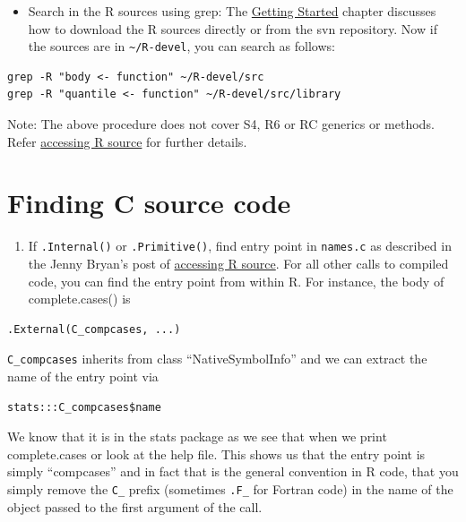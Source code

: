 \documentclass[
]{book}
\providecommand{\tightlist}{%
  \setlength{\itemsep}{0pt}\setlength{\parskip}{0pt}}
\begin{document}
\begin{itemize}
\tightlist
\item
  Search in the R sources using grep: The \protect\hyperlink{GetStart}{Getting Started} chapter discusses how to download the R sources directly or from the svn repository. Now if the sources are in \texttt{\textasciitilde{}/R-devel}, you can search as follows:
\end{itemize}

\begin{verbatim}
grep -R "body <- function" ~/R-devel/src
grep -R "quantile <- function" ~/R-devel/src/library
\end{verbatim}

Note: The above procedure does not cover S4, R6 or RC generics or methods. Refer \href{https://github.com/jennybc/access-r-source}{accessing R source} for further details.

\hypertarget{finding-c-source-code}{%
\section{Finding C source code}\label{finding-c-source-code}}

\begin{enumerate}
\def\labelenumi{\arabic{enumi}.}
\tightlist
\item
  If \texttt{.Internal()} or \texttt{.Primitive()}, find entry point in \texttt{names.c} as described in the Jenny Bryan's post of \href{https://github.com/jennybc/access-r-source}{accessing R source}. For all other calls to compiled code, you can find the entry point from within R. For instance, the body of complete.cases() is
\end{enumerate}

\begin{verbatim}
.External(C_compcases, ...)
\end{verbatim}

\texttt{C\_compcases} inherits from class ``NativeSymbolInfo'' and we can extract the name of the entry point via

\begin{verbatim}
stats:::C_compcases$name
\end{verbatim}

We know that it is in the stats package as we see that when we print complete.cases or look at the help file. This shows us that the entry point is simply ``compcases'' and in fact that is the general convention in R code, that you simply remove the \texttt{C\_} prefix (sometimes \texttt{.F\_} for Fortran code) in the name of the object passed to the first argument of the call.
\end{document}
